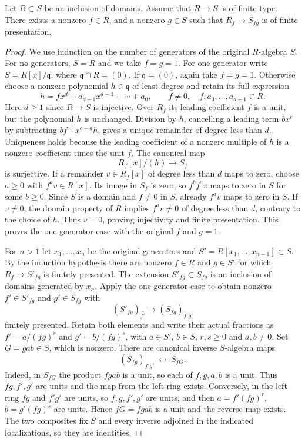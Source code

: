 \begin{lemma}
\label{lemma-generic-finite-presentation}
Let $R \subset S$ be an inclusion of domains.
Assume that $R \to S$ is of finite type.
There exists a nonzero $f \in R$, and a nonzero $g \in S$
such that $R_f \to S_{fg}$ is of finite presentation.
\end{lemma}

\begin{proof}
We use induction on the number of generators of the original
$R$-algebra $S$. For no generators, $S=R$ and we take $f=g=1$.
For one generator write $S=R[x]/\mathfrak q$, where
$\mathfrak q\cap R=(0)$. If $\mathfrak q=(0)$, again take $f=g=1$.
Otherwise choose a nonzero polynomial $h\in\mathfrak q$ of least
degree and retain its full expression
$$
h=f x^d+a_{d-1}x^{d-1}+\cdots+a_0,
\qquad f\ne0,\quad f,a_0,\ldots,a_{d-1}\in R.
$$
Here $d\geq1$ since $R\to S$ is injective. Over $R_f$ its leading
coefficient $f$ is a unit, but the polynomial $h$ is unchanged.
Division by $h$, cancelling a leading term $b x^e$ by subtracting
$bf^{-1}x^{e-d}h$, gives a unique remainder of degree less than $d$.
Uniqueness holds because the leading coefficient of a nonzero
multiple of $h$ is a nonzero coefficient times the unit $f$.
The canonical map
$$
R_f[x]/(h)\longrightarrow S_f
$$
is surjective. If a remainder $v\in R_f[x]$ of degree less than $d$
maps to zero, choose $a\geq0$ with $f^av\in R[x]$.
Its image in $S_f$ is zero, so $f^b f^av$ maps to zero in $S$ for
some $b\geq0$. Since $S$ is a domain and $f\ne0$ in $S$, already
$f^av$ maps to zero in $S$. If $v\ne0$, the domain property of $R$
implies $f^av\ne0$ of degree less than $d$, contrary to the choice
of $h$. Thus $v=0$, proving injectivity and finite presentation.
This proves the one-generator case with the original $f$ and $g=1$.

\medskip\noindent
For $n>1$ let $x_1,\ldots,x_n$ be the original generators and
$S'=R[x_1,\ldots,x_{n-1}]\subset S$. By the induction hypothesis
there are nonzero $f\in R$ and $g\in S'$ for which
$R_f\to S'_{fg}$ is finitely presented. The extension
$S'_{fg}\subset S_{fg}$ is an inclusion of domains generated by
$x_n$. Apply the one-generator case to obtain nonzero
$f'\in S'_{fg}$ and $g'\in S_{fg}$ with
$$
(S'_{fg})_{f'}\longrightarrow (S_{fg})_{f'g'}
$$
finitely presented. Retain both elements and write their actual
fractions as $f'=a/(fg)^r$ and $g'=b/(fg)^s$, with
$a\in S'$, $b\in S$, $r,s\geq0$ and $a,b\ne0$.
Set $G=gab\in S$, which is nonzero. There are canonical inverse
$S$-algebra maps
$$
(S_{fg})_{f'g'}\ \longleftrightarrow\ S_{fG}.
$$
Indeed, in $S_{fG}$ the product $fgab$ is a unit, so each of
$f,g,a,b$ is a unit. Thus $fg,f',g'$ are units and the map from
the left ring exists. Conversely, in the left ring $fg$ and $f'g'$
are units, so $f,g,f',g'$ are units, and then
$a=f'(fg)^r$, $b=g'(fg)^s$ are units. Hence $fG=fgab$ is a unit
and the reverse map exists. The two composites fix $S$ and every
inverse adjoined in the indicated localizations, so they are identities.


\end{proof}
